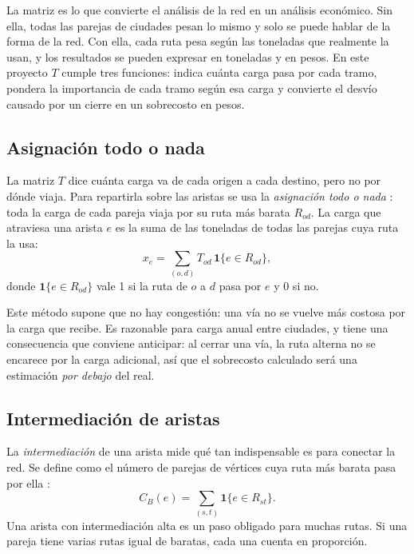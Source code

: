 \documentclass[conference]{IEEEtran}
\begin{document}
La matriz es lo que convierte el análisis de la red en un análisis económico.
Sin ella, todas las parejas de ciudades pesan lo mismo y solo se puede hablar
de la forma de la red. Con ella, cada ruta pesa según las toneladas que
realmente la usan, y los resultados se pueden expresar en toneladas y en pesos.
En este proyecto $T$ cumple tres funciones: indica cuánta carga pasa por cada
tramo, pondera la importancia de cada tramo según esa carga y convierte el
desvío causado por un cierre en un sobrecosto en pesos.

\subsection{Asignación todo o nada}
\label{sub:asignacion}

La matriz $T$ dice cuánta carga va de cada origen a cada destino, pero no por
dónde viaja. Para repartirla sobre las aristas se usa la \emph{asignación todo
o nada} \cite{ortuzar2011}: toda la carga de cada pareja viaja por su ruta más
barata $R_{od}$. La carga que atraviesa una arista $e$ es la suma de las
toneladas de todas las parejas cuya ruta la usa:
\begin{equation}\label{eq:flujo}
x_e=\sum_{(o,d)} T_{od}\,\mathbf{1}\{e\in R_{od}\},
\end{equation}
donde $\mathbf{1}\{e\in R_{od}\}$ vale 1 si la ruta de $o$ a $d$ pasa por $e$ y
0 si no.

Este método supone que no hay congestión: una vía no se vuelve más costosa por
la carga que recibe. Es razonable para carga anual entre ciudades, y tiene una
consecuencia que conviene anticipar: al cerrar una vía, la ruta alterna no se
encarece por la carga adicional, así que el sobrecosto calculado será una
estimación \emph{por debajo} del real.

\subsection{Intermediación de aristas}
\label{sub:btw}

La \emph{intermediación} de una arista mide qué tan indispensable es para
conectar la red. Se define como el número de parejas de vértices cuya ruta más
barata pasa por ella \cite{brandes2001}:
\begin{equation}\label{eq:btw}
C_B(e)=\sum_{(s,t)} \mathbf{1}\{e\in R_{st}\}.
\end{equation}
Una arista con intermediación alta es un paso obligado para muchas rutas. Si una
pareja tiene varias rutas igual de baratas, cada una cuenta en proporción.
\end{document}
